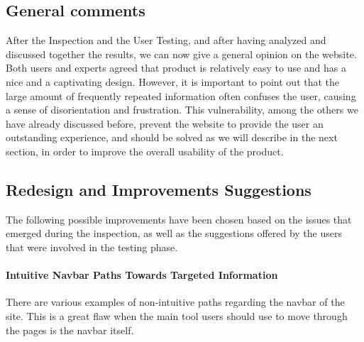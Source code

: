 \documentclass[11pt]{article} %
\begin{document}
\subsection{General comments}
After the Inspection and the User Testing, and after having analyzed and discussed together the results, we can now give a general opinion on the website. Both users and experts agreed that product is relatively easy to use and has a nice and a captivating design.
However, it is important to point out that the large amount of frequently repeated information often confuses the user, causing a sense of disorientation and frustration. This vulnerability, among the others we have already discussed before, prevent the website to provide the user an outstanding experience, and should be solved as we will describe in the next section, in order to improve the overall usability of the product.

\subsection{Redesign and Improvements Suggestions}
The following possible improvements have been chosen based on the issues that emerged during the inspection, as well as the suggestions offered by the users that were involved in the testing phase.

\paragraph{Intuitive Navbar Paths Towards Targeted Information}
There are various examples of non-intuitive paths regarding the navbar of the site. This is a great flaw when the main tool users should use to move through the pages is the navbar itself.
\end{document}
